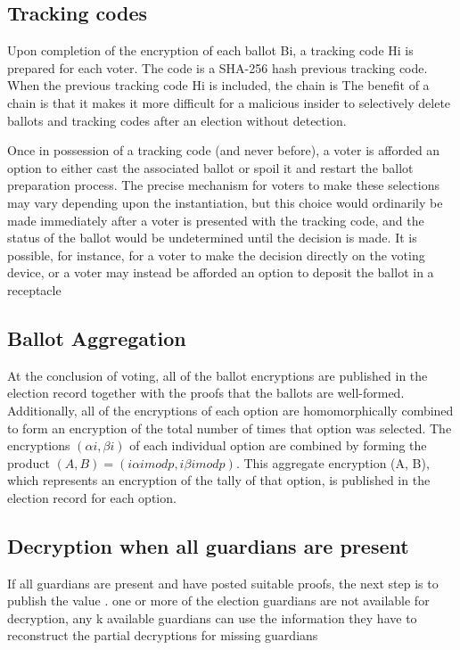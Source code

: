 \subsection{Tracking codes}
Upon completion of the encryption of each ballot Bi, a tracking code Hi is prepared for each voter. The code is a
SHA-256 hash
\cite[17]{eg-spec}
previous tracking code. When the previous tracking code Hi is included, the chain is
The benefit of a chain is that it makes it more difficult for a malicious insider to selectively delete ballots and
tracking codes after an election without detection.
\cite[17]{eg-spec}

Once in possession of a tracking code (and never before), a voter is afforded an option to either cast the associated
ballot or spoil it and restart the ballot preparation process. The precise mechanism for voters to make these selections
may vary depending upon the instantiation, but this choice would ordinarily be made immediately after a voter is
presented with the tracking code, and the status of the ballot would be undetermined until the decision is made. It is
possible, for instance, for a voter to make the decision directly on the voting device, or a voter may instead be
afforded an option to deposit the ballot in a receptacle
\cite[17]{eg-spec}

\subsection{Ballot Aggregation}
At the conclusion of voting, all of the ballot encryptions are published in the election record together with the proofs
that the ballots are well-formed. Additionally, all of the encryptions of each option are homomorphically combined to
form an encryption of the total number of times that option was selected. The encryptions $(\alpha i, \beta i)$ of each individual
option are combined by forming the product $(A, B) = ( i \alpha i mod p,  i \beta i mod p)$. This aggregate encryption (A, B),
which represents an encryption of the tally of that option, is published in the election record for each option.
\cite[18]{eg-spec}

\subsection{Decryption when all guardians are present}
If all guardians are present and have posted suitable proofs, the next step is to publish the value
\cite[19]{eg-spec}.
one or more of the election guardians are not available for decryption, any k available guardians can use the
information they have to reconstruct the partial decryptions for missing guardians
\cite[19]{eg-spec}

